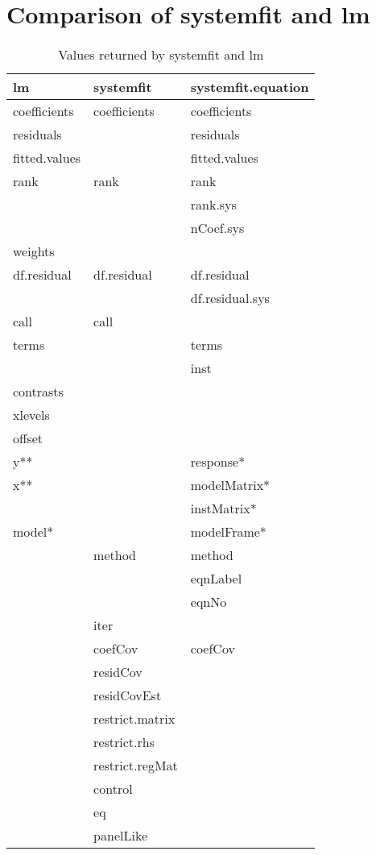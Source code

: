 \section{Comparison of systemfit and lm}

\begin{table}[htbp]
\caption{Values returned by systemfit and lm}
\begin{tabular}{lll}
\hline
lm & systemfit & systemfit.equation \\
\hline
coefficients    & coefficients   & coefficients \\
residuals       &                & residuals \\
fitted.values   &                & fitted.values \\
rank            & rank           & rank \\
                &                & rank.sys \\
                &                & nCoef.sys \\
weights         &                & \\
df.residual     & df.residual    & df.residual \\
                &                & df.residual.sys \\
call            & call           & \\
terms           &                & terms \\
                &                & inst \\
contrasts       &                & \\
xlevels         &                & \\
offset          &                & \\
y**             &                & response* \\
x**             &                & modelMatrix* \\
                &                & instMatrix* \\
model*          &                & modelFrame* \\
                & method         & method \\
                &                & eqnLabel \\
                &                & eqnNo \\
                & iter           & \\
                & coefCov        & coefCov \\
                & residCov       & \\
                & residCovEst    & \\
                & restrict.matrix& \\
                & restrict.rhs   & \\
                & restrict.regMat& \\
                & control        & \\
                & eq             & \\
                & panelLike      & \\
\hline
\end{tabular}
\end{table}
